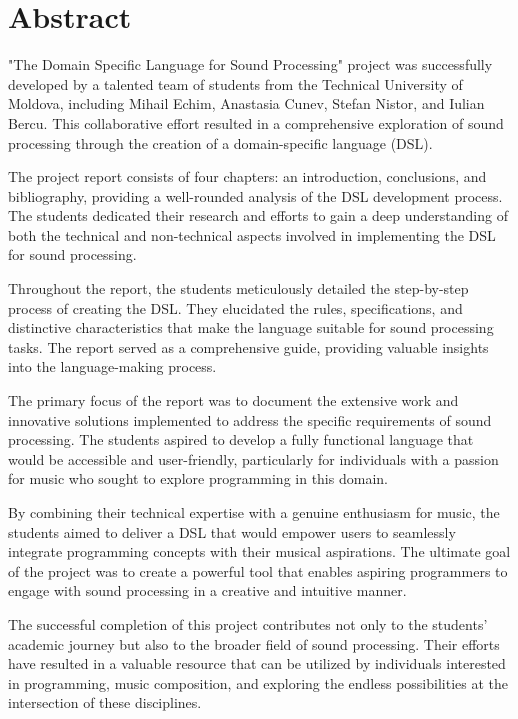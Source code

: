 \chapter*{Abstract}

"The Domain Specific Language for Sound Processing" project was successfully developed by a talented team of students from the Technical University of Moldova, including Mihail Echim, Anastasia Cunev, Stefan Nistor, and Iulian Bercu. This collaborative effort resulted in a comprehensive exploration of sound processing through the creation of a domain-specific language (DSL).

The project report consists of four chapters: an introduction, conclusions, and bibliography, providing a well-rounded analysis of the DSL development process. The students dedicated their research and efforts to gain a deep understanding of both the technical and non-technical aspects involved in implementing the DSL for sound processing.

Throughout the report, the students meticulously detailed the step-by-step process of creating the DSL. They elucidated the rules, specifications, and distinctive characteristics that make the language suitable for sound processing tasks. The report served as a comprehensive guide, providing valuable insights into the language-making process.

The primary focus of the report was to document the extensive work and innovative solutions implemented to address the specific requirements of sound processing. The students aspired to develop a fully functional language that would be accessible and user-friendly, particularly for individuals with a passion for music who sought to explore programming in this domain.

By combining their technical expertise with a genuine enthusiasm for music, the students aimed to deliver a DSL that would empower users to seamlessly integrate programming concepts with their musical aspirations. The ultimate goal of the project was to create a powerful tool that enables aspiring programmers to engage with sound processing in a creative and intuitive manner.

The successful completion of this project contributes not only to the students' academic journey but also to the broader field of sound processing. Their efforts have resulted in a valuable resource that can be utilized by individuals interested in programming, music composition, and exploring the endless possibilities at the intersection of these disciplines.

\clearpage